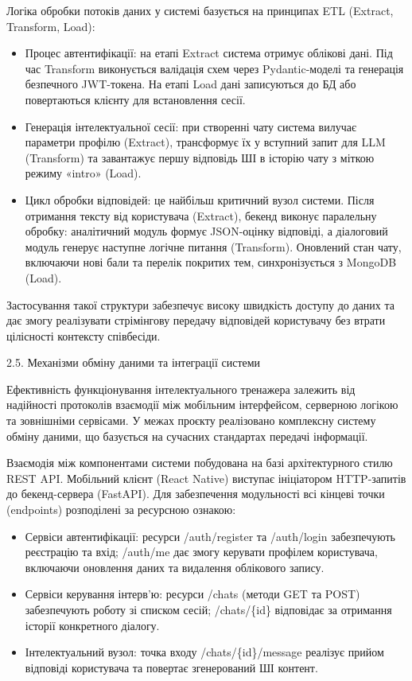 \documentclass[
]{article}
\begin{document}
Логіка обробки потоків даних у системі базується на принципах ETL
(Extract, Transform, Load):

\begin{itemize}
\item
  Процес автентифікації: на етапі Extract система отримує облікові дані.
  Під час Transform виконується валідація схем через Pydantic-моделі та
  генерація безпечного JWT-токена. На етапі Load дані записуються до БД
  або повертаються клієнту для встановлення сесії.
\item
  Генерація інтелектуальної сесії: при створенні чату система вилучає
  параметри профілю (Extract), трансформує їх у вступний запит для LLM
  (Transform) та завантажує першу відповідь ШІ в історію чату з міткою
  режиму «intro» (Load).
\item
  Цикл обробки відповідей: це найбільш критичний вузол системи. Після
  отримання тексту від користувача (Extract), бекенд виконує паралельну
  обробку: аналітичний модуль формує JSON-оцінку відповіді, а діалоговий
  модуль генерує наступне логічне питання (Transform). Оновлений стан
  чату, включаючи нові бали та перелік покритих тем, синхронізується з
  MongoDB (Load).
\end{itemize}

Застосування такої структури забезпечує високу швидкість доступу до
даних та дає змогу реалізувати стрімінгову передачу відповідей
користувачу без втрати цілісності контексту співбесіди.

\protect{}\label{_Toc228981063}{}2.5. Механізми обміну
даними та інтеграції системи

Ефективність функціонування інтелектуального тренажера залежить від
надійності протоколів взаємодії між мобільним інтерфейсом, серверною
логікою та зовнішніми сервісами. У межах проєкту реалізовано комплексну
систему обміну даними, що базується на сучасних стандартах передачі
інформації.

Взаємодія між компонентами системи побудована на базі архітектурного
стилю REST API. Мобільний клієнт (React Native) виступає ініціатором
HTTP-запитів до бекенд-сервера (FastAPI). Для забезпечення модульності
всі кінцеві точки (endpoints) розподілені за ресурсною ознакою:

\begin{itemize}
\item
  Сервіси автентифікації: ресурси /auth/register та /auth/login
  забезпечують реєстрацію та вхід; /auth/me дає змогу керувати профілем
  користувача, включаючи оновлення даних та видалення облікового запису.
\item
  Сервіси керування інтерв'ю: ресурси /chats (методи GET та POST)
  забезпечують роботу зі списком сесій; /chats/\{id\} відповідає за
  отримання історії конкретного діалогу.
\item
  Інтелектуальний вузол: точка входу /chats/\{id\}/message реалізує
  прийом відповіді користувача та повертає згенерований ШІ контент.
\end{itemize}
\end{document}
